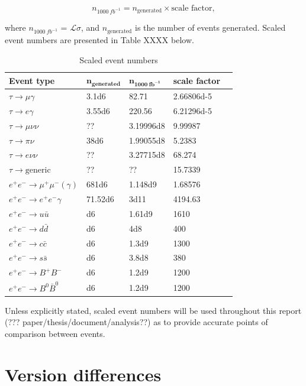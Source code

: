 \documentclass[12pt]{thesis}  %
\begin{document}
\begin{equation}
n_{\SI{1000}{fb^{-1}}} = n_{\text{generated}} \times \text{scale factor},
\end{equation}

where $n_{\SI{1000}{fb^{-1}}}$ = $\mathcal{L} \sigma$, and $n_{\text{generated}}$ is the number of events generated. Scaled event numbers are presented in Table XXXX below.

\begin{table}[h]
\centering
\begin{tabular}{lllll}
\textbf{Event type} & $\mathbf{n_{\text{generated}}}$ & $\mathbf{n_{\SI{1000}{fb^{-1}}}}$ & 
\textbf{scale factor}\\\hline
\rowcolor[HTML]{EFEFEF} 
$\tau \to \mu\gamma$ & \num{3.1d6} & 82.71 & \num{2.66806d-5}\\
\rowcolor[HTML]{EFEFEF} 
$\tau \to e\gamma$ & \num{3.55d6} & 220.56 & \num{6.21296d-5} \\       
$\tau \to \mu\nu\nu$ & ?? & \num{3.19996d8} & 9.99987\\
$\tau \to \pi\nu$ & \num{38d6} & \num{1.99055d8} & 5.2383 \\
$\tau \to e\nu\nu$ & ?? & \num{3.27715d8} & 68.274 \\
$\tau \to \text{generic}$ & ?? & ?? & 15.7339  \\
$e^+e^- \to \mu^+\mu^-(\gamma)$ & \num{681d6} & \num{1.148d9} & 1.68576 \\
$e^+e^- \to e^+e^-\gamma$ & \num{71.52d6} & \num{3d11} & 4194.63 \\
$e^+e^- \to u\bar{u}$ & \num{d6} & \num{1.61d9} & 1610 \\
$e^+e^- \to d\bar{d}$ & \num{d6} & \num{4d8} & 400 \\
$e^+e^- \to c\bar{c}$ & \num{d6} & \num{1.3d9} & 1300 \\
$e^+e^- \to s\bar{s}$ & \num{d6} & \num{3.8d8} & 380 \\
$e^+e^- \to B^+B^-$ & \num{d6} & \num{1.2d9} & 1200 \\
$e^+e^- \to B^0\bar{B}^0$ & \num{d6} & \num{1.2d9} & 1200
\end{tabular}
\caption{Scaled event numbers}
\label{my-label}
\end{table}

Unless explicitly stated, scaled event numbers will be used throughout this report (??? paper/thesis/document/analysis??) as to provide accurate points of comparison between events.


\section{Version differences}
\end{document}
